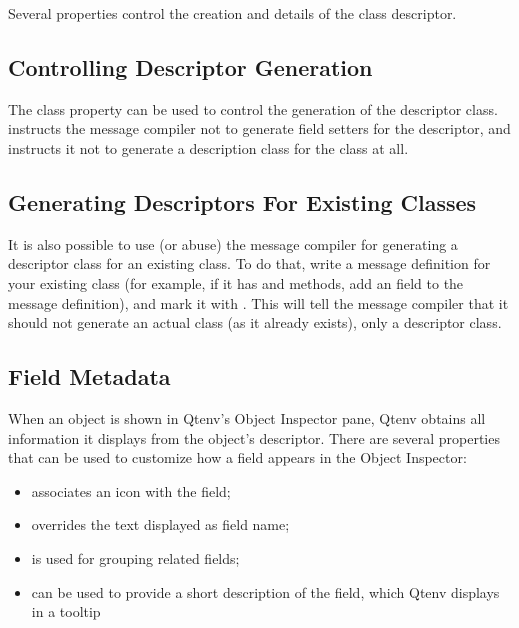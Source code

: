 Several properties control the creation and details of the class descriptor.


\subsection{Controlling Descriptor Generation}
\label{sec:msg-defs:descriptor-property}

The  class property can be used to control the generation
of the descriptor class.  instructs the message
compiler not to generate field setters for the descriptor, and
 instructs it not to generate a description class
for the class at all.


\subsection{Generating Descriptors For Existing Classes}
\label{sec:msg-defs:descriptor-existingclass-property}

It is also possible to use (or abuse) the message compiler for generating a
descriptor class for an existing class. To do that, write a message definition
for your existing class (for example, if it has  and
 methods, add an  field to the message
definition), and mark it with . This will tell the
message compiler that it should not generate an actual class (as it already
exists), only a descriptor class.


\subsection{Field Metadata}
\label{sec:msg-defs:descriptor-field-meadata}

When an object is shown in Qtenv's Object Inspector pane, Qtenv obtains all
information it displays from the object's descriptor. There are several
properties that can be used to customize how a field appears in the Object
Inspector:

\begin{itemize}
  \item {} associates an icon with the field;
  \item {} overrides the text displayed as field name;
  \item {} is used for grouping related fields;
  \item {} can be used to provide a short description of the field,
    which Qtenv displays in a tooltip
\end{itemize}


